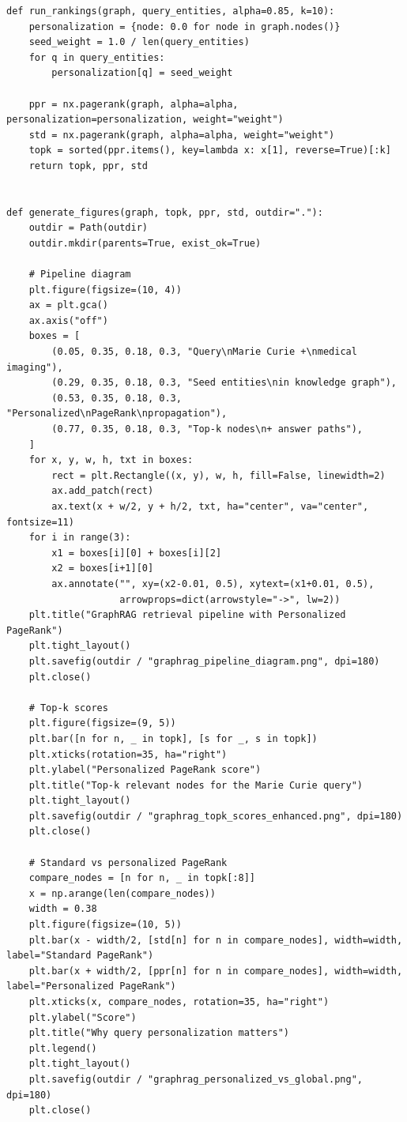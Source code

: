 \documentclass[12pt]{article}
\begin{document}
\begin{lstlisting}[style=pythonstyle]
def run_rankings(graph, query_entities, alpha=0.85, k=10):
    personalization = {node: 0.0 for node in graph.nodes()}
    seed_weight = 1.0 / len(query_entities)
    for q in query_entities:
        personalization[q] = seed_weight

    ppr = nx.pagerank(graph, alpha=alpha, personalization=personalization, weight="weight")
    std = nx.pagerank(graph, alpha=alpha, weight="weight")
    topk = sorted(ppr.items(), key=lambda x: x[1], reverse=True)[:k]
    return topk, ppr, std


def generate_figures(graph, topk, ppr, std, outdir="."):
    outdir = Path(outdir)
    outdir.mkdir(parents=True, exist_ok=True)

    # Pipeline diagram
    plt.figure(figsize=(10, 4))
    ax = plt.gca()
    ax.axis("off")
    boxes = [
        (0.05, 0.35, 0.18, 0.3, "Query\nMarie Curie +\nmedical imaging"),
        (0.29, 0.35, 0.18, 0.3, "Seed entities\nin knowledge graph"),
        (0.53, 0.35, 0.18, 0.3, "Personalized\nPageRank\npropagation"),
        (0.77, 0.35, 0.18, 0.3, "Top-k nodes\n+ answer paths"),
    ]
    for x, y, w, h, txt in boxes:
        rect = plt.Rectangle((x, y), w, h, fill=False, linewidth=2)
        ax.add_patch(rect)
        ax.text(x + w/2, y + h/2, txt, ha="center", va="center", fontsize=11)
    for i in range(3):
        x1 = boxes[i][0] + boxes[i][2]
        x2 = boxes[i+1][0]
        ax.annotate("", xy=(x2-0.01, 0.5), xytext=(x1+0.01, 0.5),
                    arrowprops=dict(arrowstyle="->", lw=2))
    plt.title("GraphRAG retrieval pipeline with Personalized PageRank")
    plt.tight_layout()
    plt.savefig(outdir / "graphrag_pipeline_diagram.png", dpi=180)
    plt.close()

    # Top-k scores
    plt.figure(figsize=(9, 5))
    plt.bar([n for n, _ in topk], [s for _, s in topk])
    plt.xticks(rotation=35, ha="right")
    plt.ylabel("Personalized PageRank score")
    plt.title("Top-k relevant nodes for the Marie Curie query")
    plt.tight_layout()
    plt.savefig(outdir / "graphrag_topk_scores_enhanced.png", dpi=180)
    plt.close()

    # Standard vs personalized PageRank
    compare_nodes = [n for n, _ in topk[:8]]
    x = np.arange(len(compare_nodes))
    width = 0.38
    plt.figure(figsize=(10, 5))
    plt.bar(x - width/2, [std[n] for n in compare_nodes], width=width, label="Standard PageRank")
    plt.bar(x + width/2, [ppr[n] for n in compare_nodes], width=width, label="Personalized PageRank")
    plt.xticks(x, compare_nodes, rotation=35, ha="right")
    plt.ylabel("Score")
    plt.title("Why query personalization matters")
    plt.legend()
    plt.tight_layout()
    plt.savefig(outdir / "graphrag_personalized_vs_global.png", dpi=180)
    plt.close()


\end{lstlisting}
\end{document}
